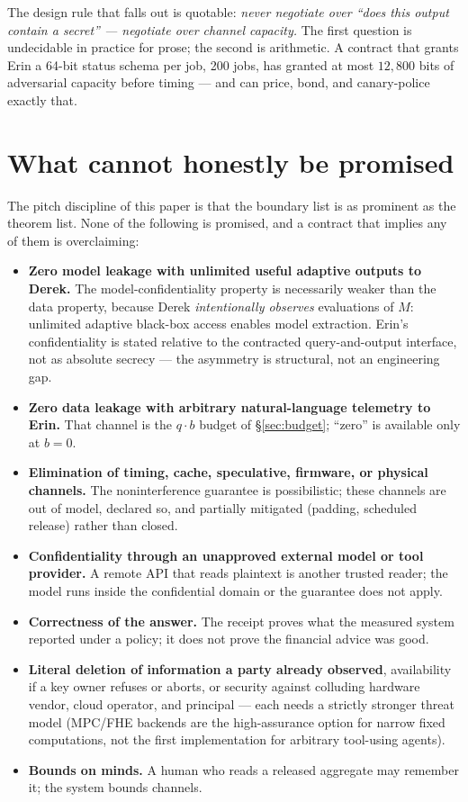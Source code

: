 \documentclass[11pt,a4paper]{article}
\begin{document}
The design rule that falls out is quotable: \emph{never negotiate over ``does this output contain a secret'' --- negotiate over
channel capacity.} The first question is undecidable in practice for prose; the second is arithmetic. A contract that grants Erin
a 64-bit status schema per job, 200 jobs, has granted at most $12{,}800$ bits of adversarial capacity before timing --- and can
price, bond, and canary-police exactly that.

\section{What cannot honestly be promised}\label{sec:cannot}

The pitch discipline of this paper is that the boundary list is as prominent as the theorem list. None of the following is
promised, and a contract that implies any of them is overclaiming:

\begin{itemize}
\item \textbf{Zero model leakage with unlimited useful adaptive outputs to Derek.} The
model-confidentiality property is necessarily weaker than the data property, because Derek \emph{intentionally observes}
evaluations of $M$: unlimited adaptive black-box access enables model extraction. Erin's confidentiality is stated relative to the
contracted query-and-output interface, not as absolute secrecy --- the asymmetry is structural, not an engineering gap.
\item \textbf{Zero data leakage with arbitrary natural-language telemetry to Erin.} That channel is
the $q\cdot b$ budget of \S\ref{sec:budget}; ``zero'' is available only at $b=0$.
\item \textbf{Elimination of timing, cache, speculative, firmware, or physical channels.} The
noninterference guarantee is possibilistic; these channels are out of model, declared so, and partially mitigated (padding,
scheduled release) rather than closed.
\item \textbf{Confidentiality through an unapproved external model or tool provider.} A remote API
that reads plaintext is another trusted reader; the model runs inside the confidential domain or the guarantee does not apply.
\item \textbf{Correctness of the answer.} The receipt proves what the measured system reported under
a policy; it does not prove the financial advice was good.
\item \textbf{Literal deletion of information a party already observed}, availability if a key owner
refuses or aborts, or security against colluding hardware vendor, cloud operator, and principal --- each needs a strictly stronger
threat model (MPC/FHE backends are the high-assurance option for narrow fixed computations, not the first implementation for
arbitrary tool-using agents).
\item \textbf{Bounds on minds.} A human who reads a released aggregate may remember it; the system
bounds channels.
\end{itemize}
\end{document}
